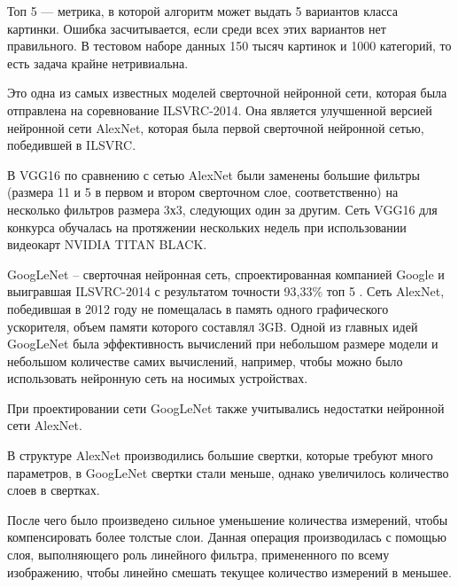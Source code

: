 Топ 5 — метрика, в которой алгоритм может выдать 5 вариантов класса картинки. Ошибка засчитывается, если среди всех этих вариантов нет правильного. В тестовом наборе данных 150 тысяч картинок и 1000 категорий, то есть задача крайне нетривиальна.

Это одна из самых известных моделей сверточной нейронной сети, которая была отправлена на соревнование ILSVRC-2014. Она является улучшенной версией нейронной сети AlexNet, которая была первой сверточной нейронной сетью, победившей в ILSVRC\cite{imagenet-challenge}.


В VGG16 по сравнению с сетью AlexNet были заменены большие фильтры (размера 11 и 5 в первом и втором сверточном слое, соответственно) на несколько фильтров размера 3х3, следующих один за другим. Сеть VGG16 для конкурса обучалась на протяжении нескольких недель при использовании видеокарт NVIDIA TITAN BLACK. 


GoogLeNet – сверточная нейронная сеть, спроектированная компанией Google и выигравшая ILSVRC-2014 с результатом точности 93,33\% топ 5 \cite{imagenet-challenge}.
Сеть AlexNet, победившая в 2012 году не помещалась в память одного графического ускорителя, объем памяти которого составлял 3GB. 
Одной из главных идей GoogLeNet была эффективность вычислений при небольшом размере модели и небольшом количестве самих вычислений, например, чтобы можно было использовать нейронную сеть на носимых устройствах.



При проектировании сети GoogLeNet также учитывались недостатки нейронной сети AlexNet. 

В структуре AlexNet производились большие свертки, которые требуют много параметров, в GoogLeNet свертки стали меньше, однако увеличилось количество слоев в свертках.

После чего было произведено сильное уменьшение количества измерений, чтобы компенсировать более толстые слои. 
Данная операция производилась с помощью слоя, выполняющего роль линейного фильтра, примененного по всему изображению, чтобы линейно смешать текущее количество измерений в меньшее.


